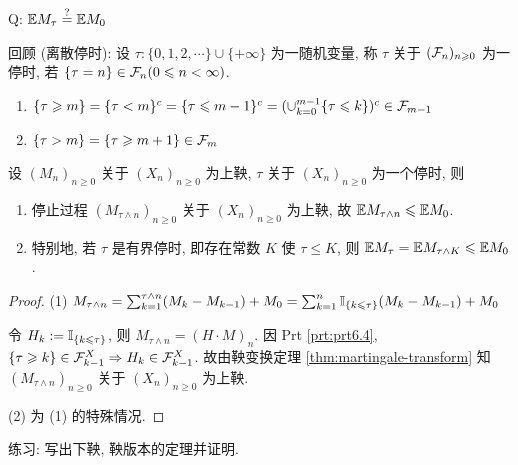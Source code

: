 Q: $\mathbb E M_{\tau}\overset{?}{=}\mathbb E M_0$

回顾 (离散停时): 设 $\tau: \{0,1,2,\cdots\}\cup \{+\infty\}$ 为一随机变量, 称 $\tau$ 关于 $(\mathcal{F}_n)_{n\geqslant 0}$ 为一停时, 若 $\{\tau=n\}\in \mathcal{F}_n(0\leqslant n<\infty)$.

\begin{property}\label{prt:prt6.4}
\begin{enumerate}
    \item $\{\tau \geqslant m\}=\{\tau <m\}^c=\{\tau\leqslant m-1\}^c=(\cup_{k=0}^{m-1}\{\tau \leqslant k\})^c\in \mathcal{F}_{m-1}$
    \item $\{\tau >m\}=\{\tau\geqslant m+1\}\in \mathcal{F}_m$
\end{enumerate}
\end{property}

\begin{theorem}[可选停时定理]\label{thm:p149-thm5.13}
    设 $(M_n)_{n\geq 0}$ 关于 $(X_n)_{n\geq 0}$ 为上鞅, $\tau$ 关于 $(X_n)_{n\geq 0}$ 为一个停时, 则
    \begin{enumerate}
        \item 停止过程 $(M_{\tau\land n})_{n\geq 0}$ 关于 $(X_n)_{n\geq 0}$ 为上鞅, 故 $\mathbb E M_{\tau\land n}\leqslant \mathbb E M_0$.
        \item 特别地, 若 $\tau$ 是有界停时, 即存在常数 $K$ 使 $\tau\leq K$, 则 $\mathbb E M_{\tau}=\mathbb E M_{\tau\land K}\leqslant \mathbb E M_0$.
    \end{enumerate}
\end{theorem}

\begin{proof}
    (1) $M_{\tau\land n}=\sum_{k=1}^{\tau\land n}(M_k-M_{k-1})+M_0=\sum_{k=1}^n \mathbb I_{\{k\leqslant \tau\}}(M_k-M_{k-1})+M_0$

    令 $H_k:=\mathbb I_{\{k\leqslant \tau\}}$, 则 $M_{\tau\land n}=(H\cdot M)_n$. 因 Prt \ref{prt:prt6.4}, $\{\tau\geqslant k\}\in \mathcal{F}_{k-1}^X\Rightarrow H_k\in \mathcal{F}_{k-1}^X$. 故由鞅变换定理 \ref{thm:martingale-transform} 知 $(M_{\tau\land n})_{n\geq 0}$ 关于 $(X_n)_{n\geq 0}$ 为上鞅.

    (2) 为 (1) 的特殊情况.
\end{proof}

练习: 写出下鞅, 鞅版本的定理并证明.

